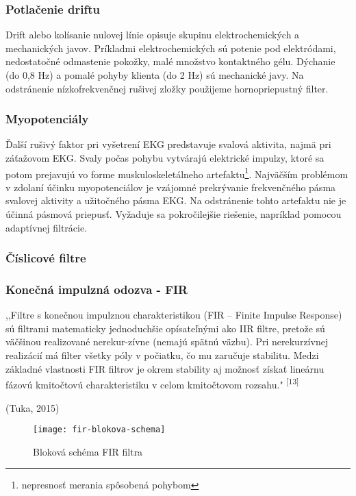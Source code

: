 \documentclass[titlepage,12pt]{article}
\begin{document}
\subsubsection{Potlačenie driftu}
Drift alebo kolísanie nulovej línie opisuje skupinu elektrochemických a mechanických javov. Príkladmi elektrochemických sú potenie pod elektródami, nedostatočné odmastenie pokožky, malé množstvo kontaktného gélu. Dýchanie (do 0,8 Hz) a pomalé pohyby klienta (do 2 Hz) sú mechanické javy. Na odstránenie nízkofrekvenčnej rušivej zložky použijeme hornopriepustný filter.

\subsubsection{Myopotenciály}
Ďalší rušivý faktor pri vyšetrení EKG predstavuje svalová aktivita, najmä pri záťažovom EKG. Svaly počas pohybu vytvárajú elektrické impulzy, ktoré sa potom prejavujú vo forme muskuloskeletálneho artefaktu\footnote{nepresnosť merania spôsobená pohybom}. Najväčším problémom v zdolaní účinku myopotenciálov je vzájomné prekrývanie frekvenčného pásma svalovej aktivity a užitočného pásma EKG. Na odstránenie tohto artefaktu nie je účinná pásmová priepusť. Vyžaduje sa pokročilejšie riešenie, napríklad pomocou adaptívnej filtrácie. 

\newpage
\subsubsection{Číslicové filtre}

\subsubsection*{Konečná impulzná odozva - FIR}
,,Filtre s konečnou impulznou charakteristikou (FIR – Finite Impulse Response) sú filtrami  matematicky  jednoduchšie  opísateľnými  ako  IIR  filtre,  pretože  sú  väčšinou realizované nerekur-zívne (nemajú spätnú väzbu). Pri nerekurzívnej realizácií má filter všetky póly v počiatku, čo mu zaručuje stabilitu. Medzi základné vlastnosti FIR filtrov je okrem stability aj možnosť získať lineárnu fázovú kmitočtovú charakteristiku v celom kmitočtovom rozsahu." \textsuperscript{[13]}
\begin{flushright}
(Tuka, 2015)
\end{flushright}

\begin{figure}[!ht]
\begin{center}
\texttt{[image: fir-blokova-schema]}
\caption{Bloková schéma FIR filtra}
\end{center}
\end{figure}
\end{document}

